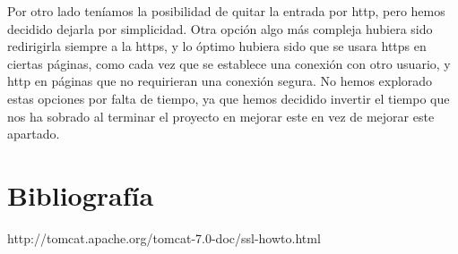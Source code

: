 \documentclass[a4paper]{article}
\begin{document}
Por otro lado teníamos la posibilidad de quitar la entrada por http, pero hemos decidido dejarla por simplicidad. Otra opción algo más compleja hubiera sido redirigirla siempre a la https, y lo óptimo hubiera sido que se usara https en ciertas páginas, como cada vez que se establece una conexión con otro usuario, y http en páginas que no requirieran una conexión segura. No hemos explorado estas opciones por falta de tiempo, ya que hemos decidido invertir el tiempo que nos ha sobrado al terminar el proyecto en mejorar este en vez de mejorar este apartado.

\section{Bibliografía}
http://tomcat.apache.org/tomcat-7.0-doc/ssl-howto.html
\end{document}
